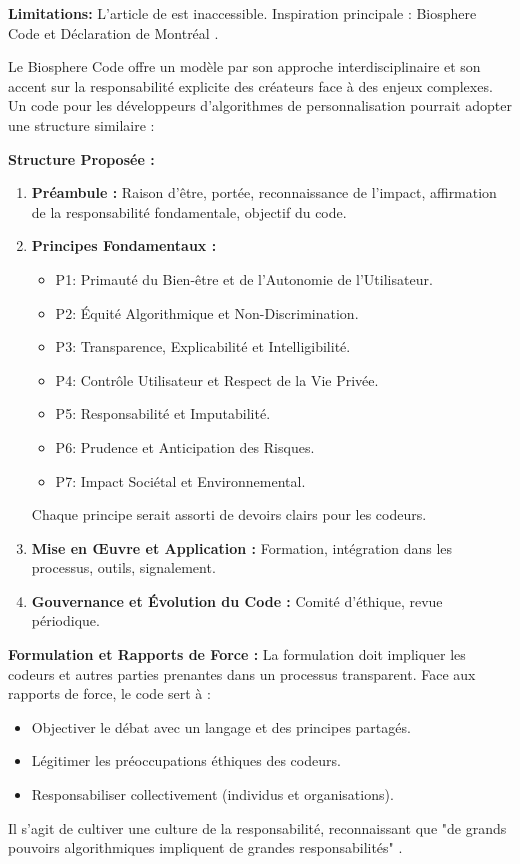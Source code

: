 \documentclass[11pt,a4paper]{article}
\begin{document}
\textbf{Limitations:} L'article de \cite{Neuer2018Inaccessible} est inaccessible. Inspiration principale : Biosphere Code \cite{BiosphereCode2015} et Déclaration de Montréal \cite{DeclarationMontreal2018}.

Le Biosphere Code \cite{BiosphereCode2015} offre un modèle par son approche interdisciplinaire et son accent sur la responsabilité explicite des créateurs face à des enjeux complexes. Un code pour les développeurs d'algorithmes de personnalisation pourrait adopter une structure similaire :

\textbf{Structure Proposée :}
\begin{enumerate}
    \item \textbf{Préambule :} Raison d'être, portée, reconnaissance de l'impact, affirmation de la responsabilité fondamentale, objectif du code.
    \item \textbf{Principes Fondamentaux :}
        \begin{itemize}
            \item P1: Primauté du Bien-être et de l'Autonomie de l'Utilisateur.
            \item P2: Équité Algorithmique et Non-Discrimination.
            \item P3: Transparence, Explicabilité et Intelligibilité.
            \item P4: Contrôle Utilisateur et Respect de la Vie Privée.
            \item P5: Responsabilité et Imputabilité.
            \item P6: Prudence et Anticipation des Risques.
            \item P7: Impact Sociétal et Environnemental.
        \end{itemize}
        Chaque principe serait assorti de devoirs clairs pour les codeurs.
    \item \textbf{Mise en Œuvre et Application :} Formation, intégration dans les processus, outils, signalement.
    \item \textbf{Gouvernance et Évolution du Code :} Comité d'éthique, revue périodique.
\end{enumerate}

\textbf{Formulation et Rapports de Force :}
La formulation doit impliquer les codeurs et autres parties prenantes dans un processus transparent. Face aux rapports de force, le code sert à :
\begin{itemize}
    \item Objectiver le débat avec un langage et des principes partagés.
    \item Légitimer les préoccupations éthiques des codeurs.
    \item Responsabiliser collectivement (individus et organisations).
\end{itemize}
Il s'agit de cultiver une culture de la responsabilité, reconnaissant que "de grands pouvoirs algorithmiques impliquent de grandes responsabilités" \cite{BiosphereCode2015}.
\end{document}
